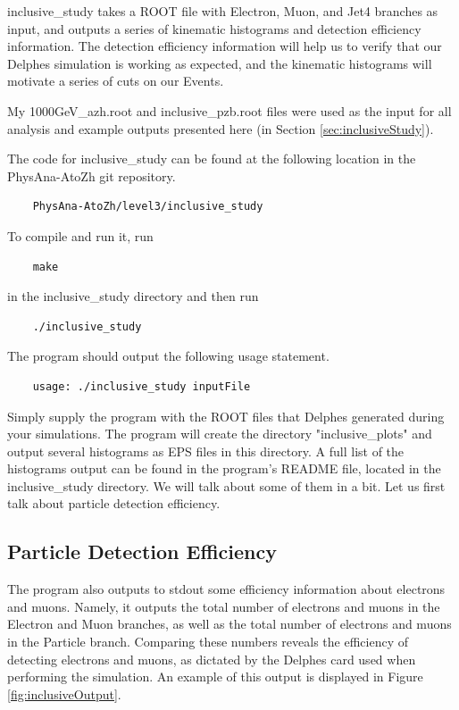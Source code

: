 \documentclass{article}
\begin{document}
inclusive\_study takes a ROOT file with Electron, Muon, and Jet4 branches as input, and outputs a series of kinematic
histograms and detection efficiency information. The detection efficiency information will help us to verify that
our Delphes simulation is working as expected, and the kinematic histograms will motivate a series of cuts on our Events.

\bigskip

My 1000GeV\_azh.root and inclusive\_pzb.root files were used as the input for all analysis and example outputs presented here (in Section \ref{sec:inclusiveStudy}).

\bigskip

The code for inclusive\_study can be found at the following location in the PhysAna-AtoZh git repository.

\begin{verbatim}
	PhysAna-AtoZh/level3/inclusive_study
\end{verbatim}

To compile and run it, run

\begin{verbatim}
	make
\end{verbatim} 

in the inclusive\_study directory and then run

\begin{verbatim}
	./inclusive_study
\end{verbatim}

The program should output the following usage statement.

\begin{verbatim}
	usage: ./inclusive_study inputFile
\end{verbatim}

Simply supply the program with the ROOT files that Delphes generated during your simulations.
The program will create the directory "inclusive\_plots" and output several histograms as EPS files in this directory.
A full list of the histograms output can be found in the program's README file, located in the inclusive\_study directory.
We will talk about some of them in a bit. Let us first talk about particle detection efficiency.

\subsection{Particle Detection Efficiency}

The program also outputs to stdout some efficiency information about electrons and muons. Namely, it outputs the total
number of electrons and muons in the Electron and Muon branches, as well as the total number of electrons and muons in
the Particle branch. Comparing these numbers reveals the efficiency of detecting electrons and muons, as dictated by
the Delphes card used when performing the simulation. An example of this output is displayed in Figure \ref{fig:inclusiveOutput}.
\end{document}
